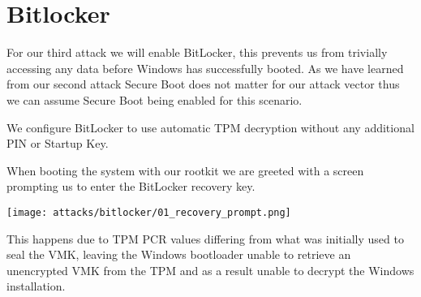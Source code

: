 \section{Bitlocker}


For our third attack we will enable BitLocker, this prevents us from trivially accessing any data before Windows has successfully booted.
 As we have learned from our second attack Secure Boot does not matter for our attack vector thus we can assume Secure Boot being enabled for this scenario.

We configure BitLocker to use automatic TPM decryption without any additional PIN or Startup Key.
\cite{microsoft-bitlocker-basic-deployment}

When booting the system with our rootkit we are greeted with a screen prompting us to enter the BitLocker recovery key.

\texttt{[image: attacks/bitlocker/01\_recovery\_prompt.png]}

This happens due to TPM PCR values differing from what was initially used to seal the VMK, leaving the Windows bootloader unable to retrieve an unencrypted VMK from the TPM and as a result unable to decrypt the Windows installation. \cite[12.]{windows-internals-7-part2}



